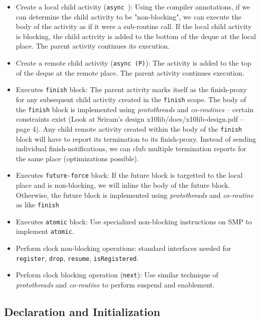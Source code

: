 \begin{itemize}

\item Create a local child activity ({\tt async }): Using the compiler
annotations, if we can determine the child activity to be "non-blocking", we
can execute the body of the activity as if it were a sub-routine call.  If the
local child activity is blocking, the child activity is added to the bottom of
the deque at the local place. The parent activity continues its execution.

\item Create a remote child activity ({\tt async (P)}): The activity is added
to the top of the deque at the remote place. The parent activity continues
execution.

\item Executes {\tt finish} block: The parent activity marks itself as the
finish-proxy for any subsequent child activity created in the {\tt finish}
scope. The body of the {\tt finish} block is implemented using {\it
protothreads} and {\it co-routines} -- certain constraints exist (Look at
Sriram's design x10lib/docs/x10lib-design.pdf -- page 4). Any child remote
activity created within the body of the {\tt finish} block will have to report
its termination to its finish-proxy. Instead of sending individual
finish-notifications, we can club multiple termination reports for the same
place (optimizations possible).

\item Executes {\tt future-force} block: If the future block is targetted to
the local place and is non-blocking, we will inline the body of the future
block. Otherwise, the future block is implemented using {\it protothreads} and
{\it co-routine} as like {\tt finish}

\item Executes {\tt atomic} block: Use specialized non-blocking instructions on
SMP to implement {\tt atomic}.

\item Perform clock non-blocking operations: standard interfaces needed for
{\tt register}, {\tt drop}, {\tt resume}, {\tt isRegistered}.

\item Perform clock blocking operation ({\tt next}): Use similar technique of
{\it protothreads} and {\it co-routine} to perform suspend and enablement.
\end{itemize}

\subsection{Declaration and Initialization}

